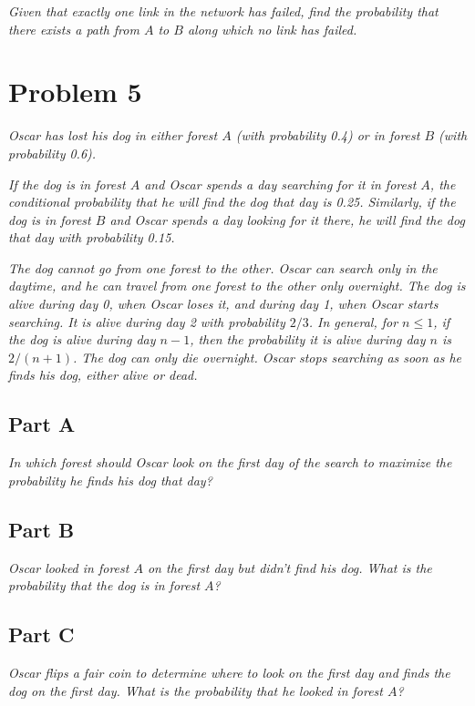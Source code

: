 \documentclass{article}
\begin{document}
\textit{Given that exactly one link in the network has failed, find the
probability that there exists a path from $ A $ to $ B $ along which no link has
failed.}

\section*{Problem 5}

\textit{Oscar has lost his dog in either forest $ A $ (with probability 0.4) or
in forest $ B $ (with probability 0.6).}

\textit{If the dog is in forest $ A $ and Oscar spends a day searching for it in
forest $ A $, the conditional probability that he will find the dog that day is
0.25.  Similarly, if the dog is in forest $ B $ and Oscar spends a day looking
for it there, he will find the dog that day with probability 0.15.}

\textit{The dog cannot go from one forest to the other. Oscar can search only in
the daytime, and he can travel from one forest to the other only overnight. The
dog is alive during day 0, when Oscar loses it, and during day 1, when Oscar
starts searching. It is alive during day 2 with probability $ 2/3 $. In general,
for $ n \leq 1 $, if the dog is alive during day $ n - 1 $, then the probability
it is alive during day $ n $ is $ 2/(n + 1) $. The dog can only die overnight.
Oscar stops searching as soon as he finds his dog, either alive or dead.}

\subsection*{Part A}

\textit{ In which forest should Oscar look on the first day of the search to
maximize the probability he finds his dog that day?}

\subsection*{Part B}

\textit{Oscar looked in forest $ A $ on the first day but didn’t find his dog.
What is the probability that the dog is in forest $ A $?}

\subsection*{Part C}

\textit{Oscar flips a fair coin to determine where to look on the first day and
finds the dog on the first day. What is the probability that he looked in forest
$ A $?}
\end{document}
